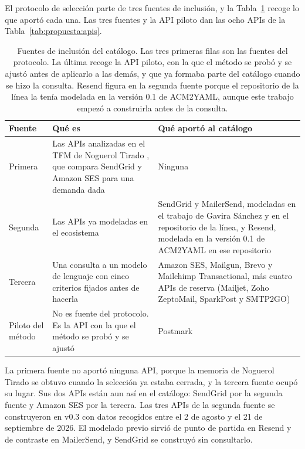 El protocolo de selección parte de tres fuentes de inclusión, y la Tabla~\ref{tab:propuesta:fuentes} recoge lo que aportó cada una.
Las tres fuentes y la API piloto dan las ocho APIs de la Tabla~\ref{tab:propuesta:apis}.

\begin{table}[H]\centering\small
\begin{tabular}{|p{2.1cm}|p{5.2cm}|p{6.8cm}|}
\hline
\raggedright\textbf{Fuente} & \raggedright\textbf{Qué es} & \raggedright\textbf{Qué aportó al catálogo} \tabularnewline
\hline
\raggedright Primera & \raggedright Las APIs analizadas en el TFM de Noguerol Tirado \citep{noguerol2025tfm}, que compara SendGrid y Amazon SES para una demanda dada & \raggedright Ninguna \tabularnewline
\hline
\raggedright Segunda & \raggedright Las APIs ya modeladas en el ecosistema & \raggedright SendGrid y MailerSend, modeladas en el trabajo de Gavira Sánchez \citep{gavira2026tfm} y en el repositorio de la línea, y Resend, modelada en la versión 0.1 de ACM2YAML en ese repositorio \citep{apisconsumptionmodel} \tabularnewline
\hline
\raggedright Tercera & \raggedright Una consulta a un modelo de lenguaje con cinco criterios fijados antes de hacerla & \raggedright Amazon SES, Mailgun, Brevo y Mailchimp Transactional, más cuatro APIs de reserva (Mailjet, Zoho ZeptoMail, SparkPost y SMTP2GO) \tabularnewline
\hline
\raggedright Piloto del método & \raggedright No es fuente del protocolo. Es la API con la que el método se probó y se ajustó & \raggedright Postmark \tabularnewline
\hline\end{tabular}
\caption[Fuentes de inclusión del catálogo]{Fuentes de inclusión del catálogo. Las tres primeras filas son las fuentes del protocolo. La última recoge la API piloto, con la que el método se probó y se ajustó antes de aplicarlo a las demás, y que ya formaba parte del catálogo cuando se hizo la consulta. Resend figura en la segunda fuente porque el repositorio de la línea la tenía modelada en la versión 0.1 de ACM2YAML, aunque este trabajo empezó a construirla antes de la consulta.}
\label{tab:propuesta:fuentes}\end{table}

La primera fuente no aportó ninguna API, porque la memoria de Noguerol Tirado se obtuvo cuando la selección ya estaba cerrada, y la tercera fuente ocupó su lugar.
Sus dos APIs están aun así en el catálogo: SendGrid por la segunda fuente y Amazon SES por la tercera.
Las tres APIs de la segunda fuente se construyeron en v0.3 con datos recogidos entre el 2 de agosto y el 21 de septiembre de 2026.
El modelado previo sirvió de punto de partida en Resend y de contraste en MailerSend, y SendGrid se construyó sin consultarlo.


